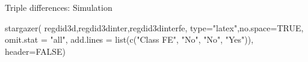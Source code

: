 \documentclass[
  ignorenonframetext,
]{beamer}
\newenvironment{Shaded}{\begin{snugshade}}{\end{snugshade}}
\newcommand{\AttributeTok}[1]{\textcolor[rgb]{0.77,0.63,0.00}{#1}}
\newcommand{\ConstantTok}[1]{\textcolor[rgb]{0.00,0.00,0.00}{#1}}
\newcommand{\FunctionTok}[1]{\textcolor[rgb]{0.00,0.00,0.00}{#1}}
\newcommand{\NormalTok}[1]{#1}
\newcommand{\StringTok}[1]{\textcolor[rgb]{0.31,0.60,0.02}{#1}}
\begin{document}
\begin{frame}[fragile]{Triple differences: Simulation}
\protect\hypertarget{triple-differences-simulation-3}{}
\tiny

\begin{Shaded}
\begin{Highlighting}[]
\FunctionTok{stargazer}\NormalTok{( regdid3d,regdid3dinter,regdid3dinterfe,}
           \AttributeTok{type=}\StringTok{"latex"}\NormalTok{,}\AttributeTok{no.space=}\ConstantTok{TRUE}\NormalTok{,  }\AttributeTok{omit.stat =} \StringTok{"all"}\NormalTok{,}
           \AttributeTok{add.lines =} \FunctionTok{list}\NormalTok{(}\FunctionTok{c}\NormalTok{(}\StringTok{"Class FE"}\NormalTok{, }\StringTok{"No"}\NormalTok{, }\StringTok{"No"}\NormalTok{, }\StringTok{"Yes"}\NormalTok{)),}
           \AttributeTok{header=}\ConstantTok{FALSE}\NormalTok{)}
\end{Highlighting}
\end{Shaded}


\end{frame}
\end{document}
